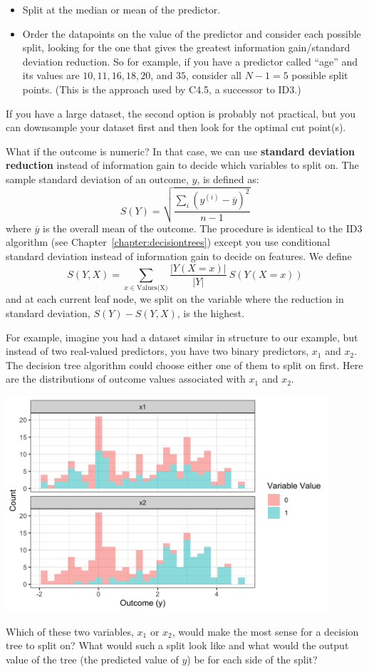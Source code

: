 \begin{itemize}
\item Split at the median or mean of the predictor.
\item Order the datapoints on the value of the predictor and consider each possible split, looking for the one that gives the greatest information gain/standard deviation reduction. So for example, if you have a predictor called ``age'' and its values are $10, 11, 16, 18, 20$, and $35$, consider all $N-1 = 5$ possible split points. (This is the approach used by C4.5, a successor to ID3.) 
\end{itemize}

If you have a large dataset, the second option is probably not practical, but you can downsample your dataset first and then look for the optimal cut point(s).

What if the outcome is numeric? In that case, we can use \textbf{standard deviation reduction} instead of information gain to decide which variables to split on. The sample standard deviation of an outcome, $y$, is defined as:
$$ S(Y) = \sqrt{\frac{\sum_i(y^{(i)} - \overline{y})^2}{n-1}} $$
where $\overline{y}$ is the overall mean of the outcome. The procedure is identical to the ID3 algorithm (see Chapter~\ref{chapter:decisiontrees}) except you use conditional standard deviation instead of information gain to decide on features. We define
$$ S(Y, X) = \sum_{x \in \text{Values(X)}} \frac{|Y(X=x)|}{|Y|}~ S(Y(X=x)) $$
and at each current leaf node, we split on the variable where the reduction in standard deviation, $S(Y) - S(Y,X)$, is the highest.

For example, imagine you had a dataset similar in structure to our example, but instead of two real-valued predictors, you have two binary predictors, $x_1$ and $x_2$. The decision tree algorithm could choose either one of them to split on first. Here are the distributions of outcome values associated with $x_1$ and $x_2$. 

\begin{center}
\includegraphics[width=0.9\textwidth]{img/esl-reg-decision-tree-varsplit.png}
\end{center}

\begin{question}{}
Which of these two variables, $x_1$ or $x_2$, would make the most sense for a decision tree to split on? What would such a split look like and what would the output value of the tree (the predicted value of $y$) be for each side of the split?
\end{question}

